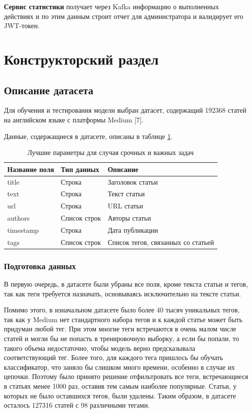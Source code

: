 \documentclass[a4paper, 12pt]{article}
\begin{document}
\begin{large}
\textbf{Сервис статистики} получает через Kafka информацию о выполненных действиях и по этим данным строит отчет для администратора и валидирует его JWT-токен.

\newpage

\section{Конструкторский раздел}
\subsection{Описание датасета}
Для обучения и тестирования модели выбран датасет, содержащий 192368 статей на английском языке с платформы Medium [7]. 

Данные, содержащиеся в датасете, описаны в таблице \ref{table:dataset}.

\begin{table}[h!]
	\captionsetup{singlelinecheck = false, justification=raggedleft}
	\caption{Лучшие параметры для случая срочных и важных задач}
	\centering
	\begin{tabular}{| p{80px} | p{80px} | p{160px} |}
	\hline
    Название поля & Тип данных & Описание \\ \hline
    title & Строка & Заголовок статьи \\ \hline
    text & Строка & Текст статьи \\ \hline
    url & Строка & URL статьи \\ \hline
    authors & Список строк & Авторы статьи \\ \hline
    timestamp & Строка & Дата публикации \\ \hline
    tags & Список строк & Список тегов, связанных со статьей \\ \hline
    \end{tabular}
    \label{table:dataset}
\end{table}

\subsubsection{Подготовка данных}
В первую очередь, в датасете были убраны все поля, кроме текста статьи и тегов, так как теги требуется назначать, основываясь исключительно на тексте статьи.

Помимо этого, в изначальном датасете было более 40 тысяч уникальных тегов, так как у Medium нет стандартного набора тегов и к каждой статье может быть придуман любой тег.
При этом многие теги встречаются в очень малом числе статей и могли бы не попасть в тренировочную выборку, а если бы попали, то такого объема недостаточно, чтобы модель верно предсказывала соответствующий тег.
Более того, для каждого тега пришлось бы обучать классификатор, что заняло бы слишком много времени, особенно в случае их цепочки.
Поэтому было принято решение отфильтровать все теги, встречающиеся в статьях менее 1000 раз, оставив тем самым наиболее популярные.
Статьи, у которых не было оставшихся тегов, были удалены.
Таким образом, в датасете осталось 127316 статей с 98 различными тегами.


\end{large}
\end{document}

